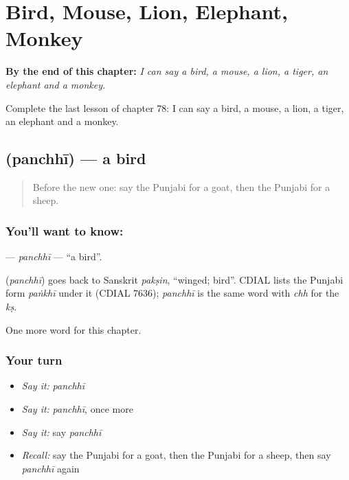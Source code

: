 
\chapter{Bird, Mouse, Lion, Elephant, Monkey}
\label{ch:pa-bird-mouse-lion-elephant-monkey}

\begin{chapteropening}
\textbf{By the end of this chapter:} \emph{I can say a bird, a mouse, a lion, a tiger, an elephant and a monkey.}

Complete the last lesson of chapter 78: I can say a bird, a mouse, a lion, a tiger, an elephant and a monkey.
\end{chapteropening}

\section[\texorpdfstring{\pa{ਪੰਛੀ} (panchhī)}{ਪੰਛੀ (panchhī)}]{ (panchhī) — a bird}

\label{lesson:PA-C78-panchhi}



\begin{quote}
Before the new one: say the Punjabi for a goat, then the Punjabi for a sheep.
\end{quote}

\subsection*{You'll want to know: }
\textbf{} — \emph{panchhī} — \textquotedblleft{}a bird\textquotedblright{}.

\begin{cousinweb}
\textbf{} (\emph{panchhī}) goes back to Sanskrit \emph{pakṣin}, \textquotedblleft{}winged; bird\textquotedblright{}. CDIAL lists the Punjabi form \emph{paṅkhī} under it (CDIAL 7636); \emph{panchhī} is the same word with \emph{chh} for the \emph{kṣ}.
\end{cousinweb}

\begin{grammarlens}[title={What you've built}]
One more word for this chapter.
\end{grammarlens}

\subsection*{Your turn}
\begin{itemize}
\raggedright
  \item \emph{Say it:} \emph{panchhī}
  \item \emph{Say it:} \emph{panchhī}, once more
  \item \emph{Say it:} say \emph{panchhī}
  \item \emph{Recall:} say the Punjabi for a goat, then the Punjabi for a sheep, then say \emph{panchhī} again
\end{itemize}

